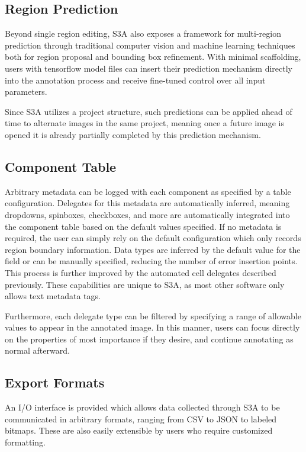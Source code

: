 \subsection{Region Prediction}

Beyond single region editing, S3A also exposes a framework for multi-region prediction through traditional computer vision and machine learning techniques both for region proposal and bounding box refinement. With minimal scaffolding, users with tensorflow model files can insert their prediction mechanism directly into the annotation process and receive fine-tuned control over all input parameters.

Since S3A utilizes a project structure, such predictions can be applied ahead of time to alternate images in the same project, meaning once a future image is opened it is already partially completed by this prediction mechanism.

\subsection{Component Table}

Arbitrary metadata can be logged with each component as specified by a table configuration. Delegates for this metadata are automatically inferred, meaning dropdowns, spinboxes, checkboxes, and more are automatically integrated into the component table based on the default values specified. If no metadata is required, the user can simply rely on the default configuration which only records region boundary information. Data types are inferred by the default value for the field or can be manually specified, reducing the number of error insertion points. This process is further improved by the automated cell delegates described previously. These capabilities are unique to S3A, as most other software only allows text metadata tags.

Furthermore, each delegate type can be filtered by specifying a range of allowable values to appear in the annotated image. In this manner, users can focus directly on the properties of most importance if they desire, and continue annotating as normal afterward.

\subsection{Export Formats}
An I/O interface is provided which allows data collected through S3A to be communicated in arbitrary formats, ranging from CSV to JSON to labeled bitmaps. These are also easily extensible by users who require customized formatting.


